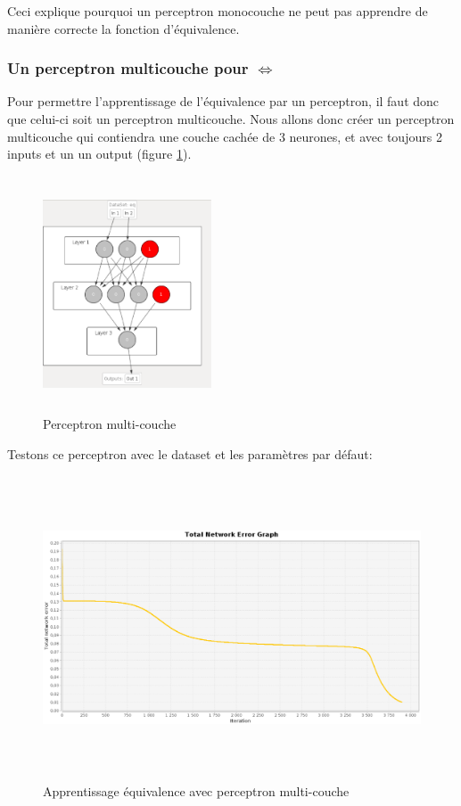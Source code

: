 \documentclass[twoside,openright,a4paper,11pt,french]{article}
\begin{document}
Ceci explique pourquoi un perceptron monocouche ne peut pas apprendre de manière correcte
la fonction d'équivalence.

\subsubsection{Un perceptron multicouche pour $ \Leftrightarrow $}

Pour permettre l'apprentissage de l'équivalence par un perceptron, il faut donc que
celui-ci soit un perceptron multicouche.
Nous allons donc créer un perceptron multicouche qui contiendra une couche cachée de
3 neurones, et avec toujours 2 inputs et un un output (figure \ref{fig:eqmq}).

\begin{figure}[ht]
\centering
\includegraphics[width=5cm,height=7cm]{./pics/eq/perceptron_multi.eps}
\caption{Perceptron multi-couche}
\label{fig:eqmq}
\end{figure}

Testons ce perceptron avec le dataset et les paramètres par défaut:

\begin{figure}[ht]
\centering
\includegraphics[width=12cm,height=9cm]{./pics/eq/multi_eq_def.eps}
\caption{Apprentissage équivalence avec perceptron multi-couche}
\end{figure}
\end{document}
